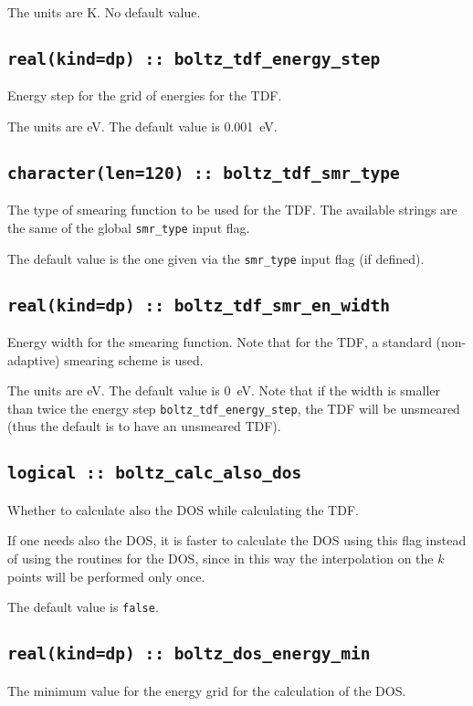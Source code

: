 The units are K.
No default value.

\subsection[boltz\_tdf\_energy\_step]{\tt real(kind=dp) :: boltz\_tdf\_energy\_step}
Energy step for the grid of energies for the TDF.

The units are eV.
The default value is 0.001~eV.

\subsection[boltz\_tdf\_smr\_type]{\tt character(len=120) :: boltz\_tdf\_smr\_type}
The type of smearing function to be used for the TDF. The available strings are the same of the global {\tt smr\_type} input flag. 

The default value is the one given via the {\tt smr\_type} input flag (if defined).

\subsection[boltz\_tdf\_smr\_en\_width]{\tt real(kind=dp) :: boltz\_tdf\_smr\_en\_width}
Energy width for the smearing function. Note that for the TDF, a standard (non-adaptive) smearing scheme is used.

The units are eV.
The default value is 0~eV. Note that if the width is smaller than twice the energy step {\tt boltz\_tdf\_energy\_step}, the TDF will be unsmeared (thus the default is to have an unsmeared TDF).

\subsection[boltz\_calc\_also\_dos]{\tt logical :: boltz\_calc\_also\_dos}
Whether to calculate also the DOS while calculating the TDF.

If one needs also the DOS, it is faster to calculate the DOS using this flag instead of using the routines for the DOS, since in this way the interpolation on the $k$ points will be performed only once.

The default value is \verb#false#.

\subsection[boltz\_dos\_energy\_min]{\tt real(kind=dp) :: boltz\_dos\_energy\_min}
The minimum value for the energy grid for the calculation of the DOS.

